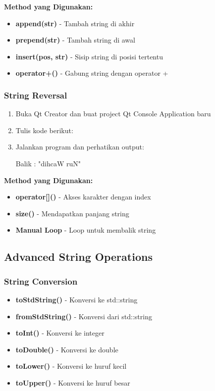 \textbf{Method yang Digunakan:}
\begin{itemize}
\item \textbf{append(str)} - Tambah string di akhir
\item \textbf{prepend(str)} - Tambah string di awal
\item \textbf{insert(pos, str)} - Sisip string di posisi tertentu
\item \textbf{operator+()} - Gabung string dengan operator +
\end{itemize}

\subsubsection{String Reversal}

\begin{enumerate}
\item Buka Qt Creator dan buat project Qt Console Application baru
\item Tulis kode berikut:



\item Jalankan program dan perhatikan output:

\begin{lcverbatim}
Balik : "dihcaW ruN"
\end{lcverbatim}
\end{enumerate}

\textbf{Method yang Digunakan:}
\begin{itemize}
\item \textbf{operator[]()} - Akses karakter dengan index
\item \textbf{size()} - Mendapatkan panjang string
\item \textbf{Manual Loop} - Loop untuk membalik string
\end{itemize}

\subsection{Advanced String Operations}

\subsubsection{String Conversion}

\begin{itemize}
\item \textbf{toStdString()} - Konversi ke std::string
\item \textbf{fromStdString()} - Konversi dari std::string
\item \textbf{toInt()} - Konversi ke integer
\item \textbf{toDouble()} - Konversi ke double
\item \textbf{toLower()} - Konversi ke huruf kecil
\item \textbf{toUpper()} - Konversi ke huruf besar
\end{itemize}

